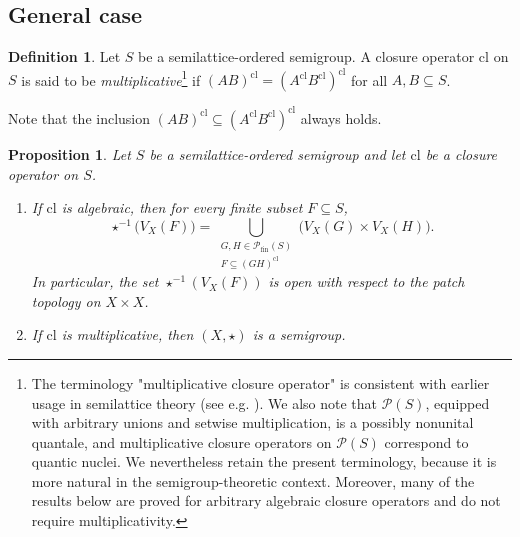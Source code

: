 \documentclass[10pt, reqno]{amsart}
\theoremstyle{plain}
\newtheorem{prop}[theorem]{Proposition}
\theoremstyle{definition}
\newtheorem{definition}[theorem]{Definition}
\begin{document}
\subsection{General case}
\begin{definition}
    Let $S$ be a semilattice-ordered semigroup. A closure operator $\mathrm{cl}$ on $S$ is said to be \emph{multiplicative}\footnote{The terminology "multiplicative closure operator" is consistent with earlier usage in semilattice theory (see e.g. \cite{Varlet_1973, Cornish_1974}). We also note that $\mathcal{P}(S)$, equipped with arbitrary unions and setwise multiplication, is a possibly nonunital quantale, and multiplicative closure operators on $\mathcal{P}(S)$ correspond to quantic nuclei. We nevertheless retain the present terminology, because it is more natural in the semigroup-theoretic context. Moreover, many of the results below are proved for arbitrary algebraic closure operators and do not require multiplicativity.} if $(AB)^\mathrm{cl} = (A^\mathrm{cl}B^\mathrm{cl})^\mathrm{cl}$ for all $A, B \subseteq S$. 
\end{definition}
\noindent Note that the inclusion $(AB)^\mathrm{cl} \subseteq (A^\mathrm{cl}B^\mathrm{cl})^\mathrm{cl}$ always holds.  
\begin{prop}\label{the_inverse_image_of_subbasic_closed_set_open_in_patch_topology}
    Let $S$ be a semilattice-ordered semigroup and let $\mathrm{cl}$ be a closure operator on $S$. 
    \begin{enumerate}[label=(\arabic*)]
    \item If $\mathrm{cl}$ is algebraic, then for every finite subset $F \subseteq S$, \begin{equation}\label{the_form_of_the_inverse_image_of_closed_subbasic_set}
        \star^{-1}\big(V_X(F)\big) = \bigcup_{\substack{G, H\in\mathcal{P}_\mathrm{fin}(S) \\ F \subseteq (GH)^\mathrm{cl}}}\big(V_X(G) \times V_X(H)\big).
    \end{equation}
    In particular, 
    the set $\star^{-1}(V_X(F))$ is open with respect to the patch topology on $X \times X$. 
    \item If $\mathrm{cl}$ is multiplicative, then $(X, \star)$ is a semigroup. 
    \end{enumerate}
\end{prop}
\end{document}
